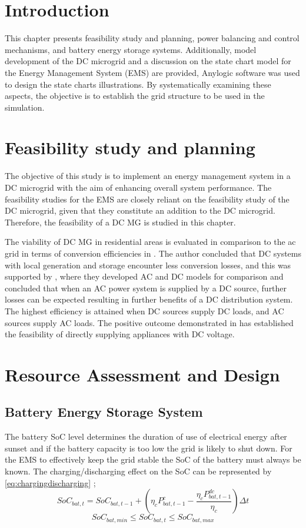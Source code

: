 \section{Introduction}
This chapter presents feasibility study and planning, power balancing and control mechanisms, and battery energy storage systems. Additionally, model development of the DC microgrid and a discussion on the state chart model for the Energy Management System (EMS) are provided, Anylogic software was used to design the state charts illustrations. By systematically examining these aspects, the objective is to establish the grid structure to be used in the simulation.
\section{Feasibility study and planning}
The objective of this study is to implement an energy management system in a DC microgrid with the aim of enhancing overall system performance. The feasibility studies for the EMS are closely reliant on the feasibility study of the DC microgrid, given that they constitute an addition to the DC microgrid. Therefore, the feasibility of a DC MG is studied in this chapter.\par
The viability of DC MG in residential areas is evaluated in comparison to the ac grid in terms of conversion efficiencies in \cite{Hammerstrom2007}. The author concluded that DC systems with local generation and storage encounter less conversion losses, and this was supported by \cite{Starke2008}, where they developed AC and DC models for comparison and concluded that when an AC power system is supplied by a DC source, further losses can be expected resulting in further benefits of a DC distribution system. The highest efficiency is attained when DC sources supply DC loads, and AC sources supply AC loads. The positive outcome demonstrated in \cite{Techakittiroj2009} has established the feasibility of directly supplying appliances with DC voltage.
\section{Resource Assessment and Design}
\subsection{Battery Energy Storage System}
The battery SoC level determines the duration of use of electrical energy after sunset \cite{Vosloo2015} and if the battery capacity is too low the grid is likely to shut down. For the EMS to effectively keep the grid stable the SoC of the battery must always be known. The charging/discharging effect on the SoC can be represented by \autoref{eq:chargingdischarging} \cite{Fulong2020};
\begin{equation}
	\label{eq:chargingdischarging}
	{SoC_{bat,t}}={SoC_{bat,t-1}} + (\eta_cP^c_{bat,t-1}-\frac{\eta_cP^{dc}_{bat,t-1}}{{\eta_c}}){\Delta}t  
\end{equation}
\begin{equation}
	{SoC_{bat,min}}\le{SoC_{bat,t}}\le{SoC_{bat,max}}
\end{equation}

